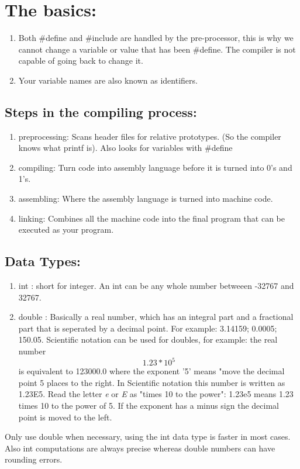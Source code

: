 \documentclass[12pt, letterpaper]{report}
\begin{document}
\section{The basics:}
\begin{enumerate}
	\item Both \#define and \#include are handled by the pre-processor, this is
		why we cannot change a variable or value that has been \#define. The 
		compiler is not capable of going back to change it.
	\item Your variable names are also known as identifiers.
\end{enumerate}

\subsection{Steps in the compiling process:}

\begin{enumerate}
	\item preprocessing: Scans header files for relative prototypes. (So the compiler knows what printf is). Also looks for variables with \#define
	\item compiling: Turn code into assembly language before it is turned into 0's and 1's.
	\item assembling: Where the assembly language is turned into machine code.
	\item linking: Combines all the machine code into the final program that can be executed as your program.
\end{enumerate}

\subsection{Data Types:}
\begin{enumerate}
	\item int : short for integer. An int can be any whole number betweeen 
		-32767 and 32767.
	\item double : Basically a real number, which has an integral part and a 
		fractional part that is seperated by a decimal point. For example: 
		3.14159; 0.0005; 150.05. Scientific notation can be used for doubles,
		for example: the real number \[ 1.23 * 10^5 \] is equivalent to 123000.0
		where the exponent '5' means "move the decimal point 5 places to the right.
		In Scientific notation this number is written as 1.23E5. Read the letter 
		\textit{e} or \textit{E} as "times 10 to the power": 1.23e5 means 1.23 times
		10 to the power of 5. If the exponent has a minus sign the decimal point is
		moved to the left.
\end{enumerate}
Only use double when necessary, using the int data type is faster in most cases. Also
int computations are always precise whereas double numbers can have rounding 
errors.
\end{document}
